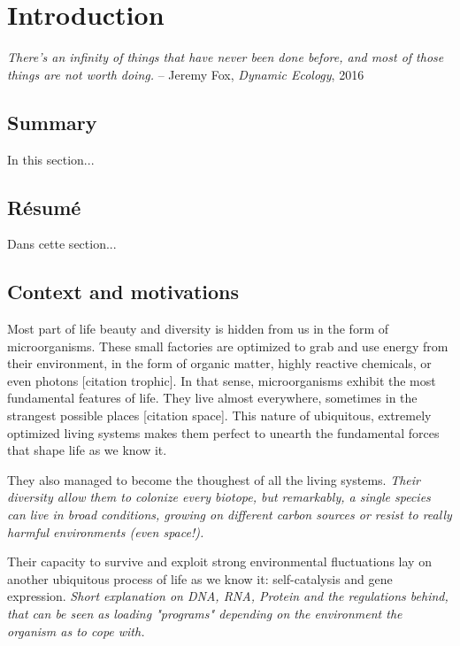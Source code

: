 \chapter{Introduction}

\textit{There's an infinity of things that have never been done before, and
most of those things are not worth doing.} -- Jeremy Fox, \textit{Dynamic Ecology}, 2016

\section*{Summary}

In this section...

\section*{Résumé}

Dans cette section...

\section{Context and motivations}

Most part of life beauty and diversity is hidden from us in the form of microorganisms.
These small factories are optimized to grab and use energy from their environment, in the form of organic matter, highly reactive chemicals, or even photons [citation trophic].
In that sense, microorganisms exhibit the most fundamental features of life.
They live almost everywhere, sometimes in the strangest possible places [citation space].
This nature of ubiquitous, extremely optimized living systems makes them perfect to unearth the fundamental forces that shape life as we know it.



They also managed to become the thoughest of all the living systems.
\textit{Their diversity allow them to colonize every biotope, but remarkably, a single species can live in broad conditions, growing on different carbon sources or resist to really harmful environments (even space!).
}

Their capacity to survive and exploit strong environmental fluctuations lay on another ubiquitous process of life as we know it: self-catalysis and gene expression.
\textit{Short explanation on DNA, RNA, Protein and the regulations behind, that can be seen as loading "programs" depending on the environment the organism as to cope with.}

